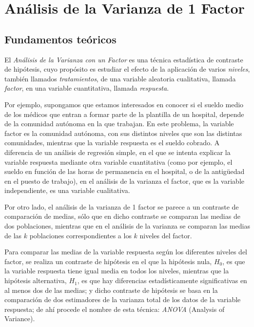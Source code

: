 
\chapter{Análisis de la Varianza de 1 Factor}

\section{Fundamentos teóricos}

El \emph{Análisis de la Varianza con un Factor} es una técnica
estadística de contraste de hipótesis, cuyo propósito es estudiar
el efecto de la aplicación de varios \emph{niveles}, también
llamados \emph{tratamientos}, de una variable aleatoria
cualitativa, llamada \emph{factor}, en una variable cuantitativa,
llamada \emph{respuesta}.

Por ejemplo, supongamos que estamos interesados en conocer si el sueldo medio de los médicos que entran a formar parte
de la plantilla de un hospital, depende de la comunidad autónoma en la que trabajan.
En este problema, la variable factor es la comunidad autónoma, con sus distintos niveles que son las distintas
comunidades, mientras que la variable respuesta es el sueldo cobrado.
A diferencia de un análisis de regresión simple, en el que se intenta explicar la variable respuesta mediante otra
variable cuantitativa (como por ejemplo, el sueldo en función de las horas de permanencia en el hospital, o de la
antigüedad en el puesto de trabajo), en el análisis de la varianza el factor, que es la variable independiente, es una
variable cualitativa.

Por otro lado, el análisis de la varianza de 1 factor se parece a un contraste de comparación de medias, sólo que en
dicho contraste se comparan las medias de dos poblaciones, mientras que en el análisis de la varianza se comparan las
medias de las $k$ poblaciones correspondientes a los $k$ niveles del factor.

Para comparar las medias de la variable respuesta según los diferentes niveles del factor, se realiza un contraste de
hipótesis en el que la hipótesis nula, $H_0$, es que la variable respuesta tiene igual media en todos los niveles,
mientras que la hipótesis alternativa, $H_1$, es que hay diferencias estadísticamente significativas en al menos dos de
las medias; y dicho contraste de hipótesis se basa en la comparación de dos estimadores de la varianza total de los
datos de la variable respuesta; de ahí procede el nombre de esta técnica: \emph{ANOVA} (Analysis of Variance).

